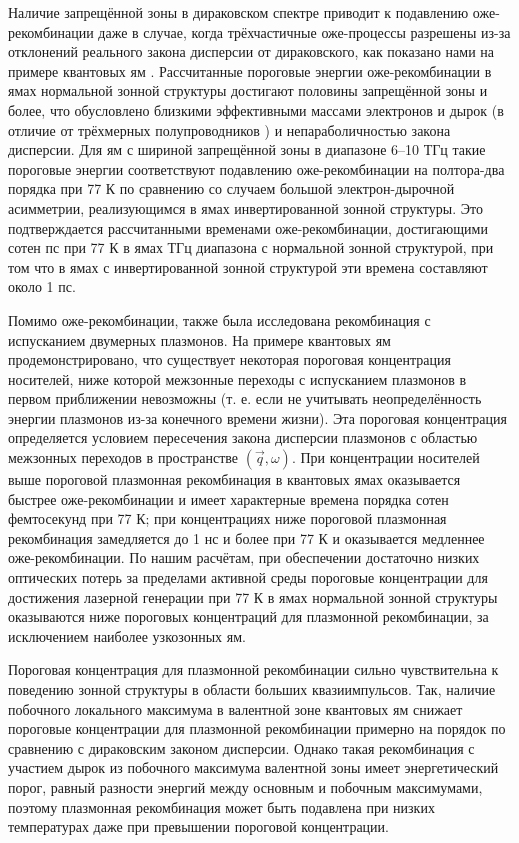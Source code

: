 Наличие запрещённой зоны в дираковском спектре приводит к подавлению оже-рекомбинации даже в случае, когда трёхчастичные оже-процессы разрешены из-за отклонений реального закона дисперсии от дираковского, как показано нами на примере квантовых ям \HgCdTe{}. Рассчитанные пороговые энергии оже-рекомбинации в ямах нормальной зонной структуры достигают половины запрещённой зоны и более, что обусловлено близкими эффективными массами электронов и дырок (в отличие от трёхмерных полупроводников \AIIIBV{}) и непараболичностью закона дисперсии. Для ям с шириной запрещённой зоны в диапазоне 6--10 ТГц такие пороговые энергии соответствуют подавлению оже-рекомбинации на полтора-два порядка при 77 К по сравнению со случаем большой электрон-дырочной асимметрии, реализующимся в ямах инвертированной зонной структуры. Это подтверждается рассчитанными временами оже-рекомбинации, достигающими сотен пс при 77 К в ямах ТГц диапазона с нормальной зонной структурой, при том что в ямах с инвертированной зонной структурой эти времена составляют около 1 пс.

Помимо оже-рекомбинации, также была исследована рекомбинация с испусканием двумерных плазмонов. На примере квантовых ям \HgCdTe{} продемонстрировано, что существует некоторая пороговая концентрация носителей, ниже которой межзонные переходы с испусканием плазмонов в первом приближении невозможны (т. е. если не учитывать неопределённость энергии плазмонов из-за конечного времени жизни). Эта пороговая концентрация определяется условием пересечения закона дисперсии плазмонов с областью межзонных переходов в пространстве $(\vec{q}, \omega)$. При концентрации носителей выше пороговой плазмонная рекомбинация в квантовых ямах \HgCdTe{} оказывается быстрее оже-рекомбинации и имеет характерные времена порядка сотен фемтосекунд при 77 К; при концентрациях ниже пороговой плазмонная рекомбинация замедляется до 1 нс и более при 77 К и оказывается медленнее оже-рекомбинации. По нашим расчётам, при обеспечении достаточно низких оптических потерь за пределами активной среды пороговые концентрации для достижения лазерной генерации при 77 К в ямах \HgCdTe{} нормальной зонной структуры оказываются ниже пороговых концентраций для плазмонной рекомбинации, за исключением наиболее узкозонных ям.

Пороговая концентрация для плазмонной рекомбинации сильно чувствительна к поведению зонной структуры в области больших квазиимпульсов. Так, наличие побочного локального максимума в валентной зоне квантовых ям \HgCdTe{} снижает пороговые концентрации для плазмонной рекомбинации примерно на порядок по сравнению с дираковским законом дисперсии. Однако такая рекомбинация с участием дырок из побочного максимума валентной зоны имеет энергетический порог, равный разности энергий между основным и побочным максимумами, поэтому плазмонная рекомбинация может быть подавлена при низких температурах даже при превышении пороговой концентрации.

